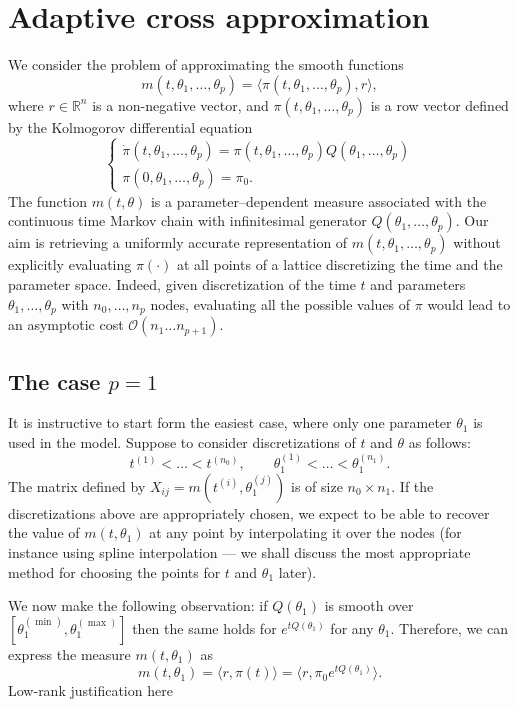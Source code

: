 \documentclass[]{article}
\begin{document}
\section{Adaptive cross approximation}

We consider the problem of approximating the smooth functions 
\[
    m(t, \theta_1, \ldots, \theta_p) = 
      \langle 
        \pi(t, \theta_1, \ldots, \theta_p), 
        r
       \rangle,
\]
where $r \in \mathbb R^n$ is a non-negative vector, 
and $\pi(t, \theta_1, \ldots, \theta_p)$ is
a row vector defined by 
the Kolmogorov differential equation
\[
    \begin{cases}
        \dot{\pi}(t, \theta_1, \ldots, \theta_p) = \pi(t, \theta_1, \ldots, \theta_p) Q(\theta_1, \ldots, \theta_p) \\ 
        \pi(0, \theta_1, \ldots, \theta_p) = \pi_0. 
    \end{cases}
\]
The function 
$m(t, \theta)$ is a parameter--dependent measure associated with
the continuous time
Markov chain with infinitesimal generator 
$Q(\theta_1, \ldots, \theta_p)$. Our aim is 
retrieving a uniformly accurate representation of 
$m(t, \theta_1, \ldots, \theta_p)$ without explicitly 
evaluating $\pi(\cdot)$ at all points 
of a lattice discretizing the time and the parameter space. 
Indeed, given discretization of the time $t$ and parameters 
$\theta_1, \ldots, \theta_p$ with $n_0, \ldots, n_p$ 
nodes, evaluating all the possible 
values of $\pi$ would lead to an asymptotic cost 
$\mathcal O(n_1 \ldots n_{p+1})$. 

\subsection{The case $p = 1$}

It is instructive to start form the easiest case, where only 
one parameter $\theta_1$ is used in the model. Suppose to 
consider discretizations of $t$ and $\theta$ 
as follows:
\[
    t^{(1)} < \ldots < t^{(n_0)}, \qquad 
    \theta_1^{(1)} < \ldots < \theta_1^{(n_1)}. 
\]
The matrix defined by $X_{ij} = m(t^{(i)}, \theta_1^{(j)})$ is of 
size $n_0 \times n_1$. If the discretizations above are 
appropriately chosen, we expect to be able to recover the 
value of $m(t, \theta_1)$ at any point by interpolating it 
over the nodes (for instance using spline interpolation --- we shall 
discuss the most appropriate method for choosing the points for 
$t$ and $\theta_1$ later). 

We now make the following observation: if 
$Q(\theta_1)$ is smooth over $[\theta_1^{(\min)}, \theta_1^{(\max)}]$
then the same holds for $e^{tQ(\theta_1)}$ for any 
$\theta_1$. Therefore, we can express the measure 
$m(t, \theta_1)$ as 
\[
    m(t, \theta_1) = \langle r, \pi(t) \rangle = 
      \langle r, \pi_0 e^{tQ(\theta_1)} \rangle. 
\]
{ \color{red} Low-rank justification here }
\end{document}
